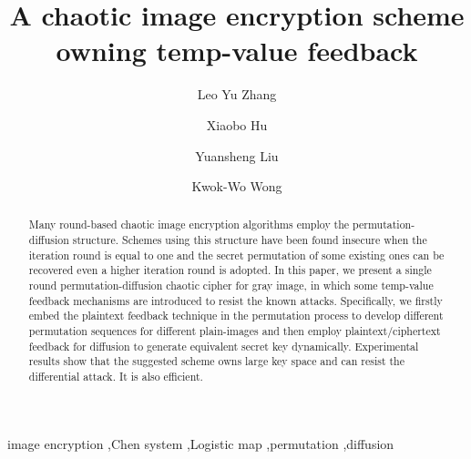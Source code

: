 \documentclass[3p,preprint,11pt]{elsarticle}
\begin{document}
\begin{frontmatter}

\title{A chaotic image encryption scheme owning temp-value feedback}

\author[hk-cityu-ee]{Leo Yu Zhang}
\author[cn-sg-epri]{Xiaobo Hu}
\author[cn-xtu-cie]{Yuansheng Liu}
\author[hk-cityu-ee]{Kwok-Wo Wong}
\address[hk-cityu-ee]{Department of Electronic Engineering, City University of Hong Kong, Hong Kong, China}
\address[cn-sg-epri]{State Grid Electric Power Research Institute, Qinghe, Beijing 100192, China}
\address[cn-xtu-cie]{College of Information Engineering, Xiangtan University, Xiangtan 411105, Hunan, China}


\begin{abstract}
Many round-based chaotic image encryption algorithms employ the permutation-diffusion structure.
Schemes using this structure have been found insecure when the iteration round is equal to one
and the secret permutation of some existing ones can be recovered even a higher iteration round is adopted.
In this paper, we present a single round permutation-diffusion chaotic cipher for gray image,
in which some temp-value feedback mechanisms are introduced to resist the known attacks.
Specifically, we firstly embed the plaintext feedback technique in the permutation process to
develop different permutation sequences for different plain-images and then employ plaintext/ciphertext
feedback for diffusion to generate equivalent secret key dynamically. Experimental results show that the
suggested scheme owns large key space and can resist the differential attack. It is also efficient.

\end{abstract}

\begin{keyword}
image encryption \sep Chen system \sep Logistic map \sep permutation \sep diffusion
\end{keyword}
\end{frontmatter}
\end{document}
